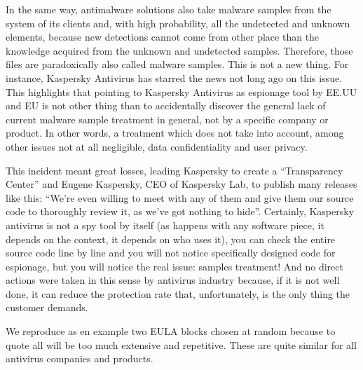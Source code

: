 In the same way, antimalware solutions also take malware samples from the
system of its clients and, with high probability, all the undetected and
unknown elements, because new detections cannot come from other place than the
knowledge acquired from the unknown and undetected samples. Therefore, those
files are paradoxically also called malware samples. This is not a new
thing. For instance, Kaspersky Antivirus has starred the news not long ago on
this issue\cite{RussianStoleNsaSpySecrets}\cite{KasperskyToolForSpying}.  This
highlights that pointing to Kaspersky Antivirus as espionage tool by EE.UU and
EU is not other thing than to accidentally discover the general lack of
current malware sample treatment in general, not by a specific company or
product. In other words, a treatment which does not take into account, among
other issues not at all negligible, data confidentiality and user privacy.

This incident meant great losses, leading Kaspersky to create a ``Transparency
Center''\cite{KasperskyTransparencyCenter} and Eugene Kaspersky, CEO of Kaspersky Lab, to publish many releases like
this: ``We’re even willing to meet with any of them and give them our source
code to thoroughly review it, as we’ve got nothing to
hide''\cite{EugeneKasperskyBlog2017}. Certainly, Kaspersky antivirus is not a spy tool by itself (as happens with
any software piece, it depends on the context, it depends on who uses it), you
can check the entire source code line by line and you will not notice
specifically designed code for espionage, but you will notice the real issue:
samples treatment! And no direct actions were taken in this sense by antivirus
industry because, if it is not well done, it can reduce the protection rate
that, unfortunately, is the only thing the customer demands.

We reproduce as en example two EULA blocks chosen at random because to quote
all will be too much extensive and repetitive. These are quite similar for all
antivirus companies and products.

